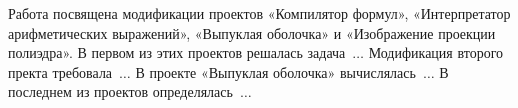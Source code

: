 Работа посвящена модификации проектов «Компилятор формул»,
«Интерпретатор арифметических выражений», «Выпуклая оболочка» и
«Изображение проекции полиэдра». В первом из этих проектов решалась
задача~$\ldots$ Модификация второго пректа требовала~$\ldots$ В проекте
«Выпуклая оболочка» вычислялась~$\ldots$ В последнем из проектов
определялась~$\ldots$
